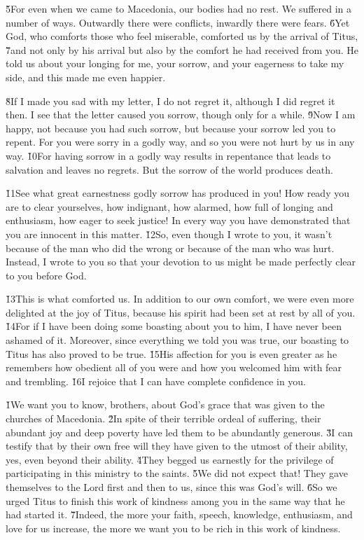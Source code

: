 \v{5}For even when we came to Macedonia, our bodies had no rest. We suffered in a number of ways. Outwardly there were conflicts, inwardly there were fears. \v{6}Yet God, who comforts those who feel miserable, comforted us by the arrival of Titus, \v{7}and not only by his arrival but also by the comfort he had received from you. He told us about your longing for me, your sorrow, and your eagerness to take my side, and this made me even happier.

\v{8}If I made you sad with my letter, I do not regret it, although I did regret it then. I see that the letter caused you sorrow, though only for a while. \v{9}Now I am happy, not because you had such sorrow, but because your sorrow led you to repent. For you were sorry in a godly way, and so you were not hurt by us in any way. \v{10}For having sorrow in a godly way results in repentance that leads to salvation and leaves no regrets. But the sorrow of the world produces death.

\v{11}See what great earnestness godly sorrow has produced in you! How ready you are to clear yourselves, how indignant, how alarmed, how full of longing and enthusiasm, how eager to seek justice! In every way you have demonstrated that you are innocent in this matter. \v{12}So, even though I wrote to you, it wasn't because of the man who did the wrong or because of the man who was hurt. Instead, I wrote to you so that your devotion to us might be made perfectly clear to you before God.

\v{13}This is what comforted us. In addition to our own comfort, we were even more delighted at the joy of Titus, because his spirit had been set at rest by all of you. \v{14}For if I have been doing some boasting about you to him, I have never been ashamed of it. Moreover, since everything we told you was true, our boasting to Titus has also proved to be true. \v{15}His affection for you is even greater as he remembers how obedient all of you were and how you welcomed him with fear and trembling. \v{16}I rejoice that I can have complete confidence in you.

\v{1}We want you to know, brothers, about God's grace that was given to the churches of Macedonia. \v{2}In spite of their terrible ordeal of suffering, their abundant joy and deep poverty have led them to be abundantly generous. \v{3}I can testify that by their own free will they have given to the utmost of their ability, yes, even beyond their ability. \v{4}They begged us earnestly for the privilege of participating in this ministry to the saints. \v{5}We did not expect that! They gave themselves to the Lord first and then to us, since this was God's will. \v{6}So we urged Titus to finish this work of kindness among you in the same way that he had started it. \v{7}Indeed, the more your faith, speech, knowledge, enthusiasm, and love for us increase, the more we want you to be rich in this work of kindness.

